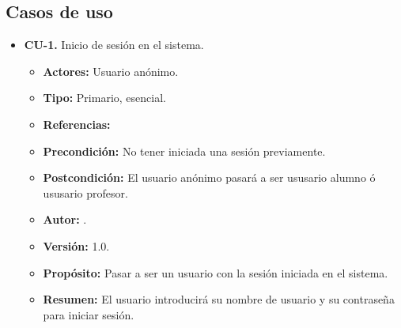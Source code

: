 \subsection{Casos de uso}

\begin{itemize}
  \item \textbf{CU-1.} Inicio de sesión en el sistema.
  \begin{itemize}
    \item \textbf{Actores:} Usuario anónimo.
    \item \textbf{Tipo:} Primario, esencial.
    \item \textbf{Referencias:}
    \item \textbf{Precondición:} No tener iniciada una sesión previamente.
    \item \textbf{Postcondición:} El usuario anónimo pasará a ser ususario alumno ó ususario profesor.
    \item \textbf{Autor:} \autor.
    \item \textbf{Versión:} 1.0.
    \item \textbf{Propósito:} Pasar a ser un usuario con la sesión iniciada en el sistema.
    \item \textbf{Resumen:} El usuario introducirá su nombre de usuario y su contraseña para iniciar sesión.


\end{itemize}
\end{itemize}

